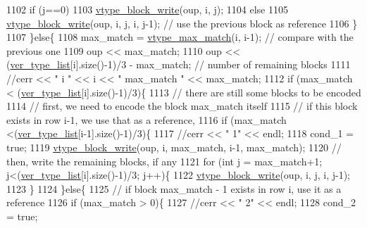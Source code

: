 \begin{DoxyCode}
1102           \textcolor{keywordflow}{if} (j==0)
1103             \hyperlink{classmarked__graph__compressed_a31f9ea72682f9072d0f90faf58a603fe}{vtype\_block\_write}(oup, i, j);
1104           \textcolor{keywordflow}{else}
1105             \hyperlink{classmarked__graph__compressed_a31f9ea72682f9072d0f90faf58a603fe}{vtype\_block\_write}(oup, i, j, i, j-1); \textcolor{comment}{// use the previous block as reference}
1106         \}
1107       \}\textcolor{keywordflow}{else}\{
1108         max\_match = \hyperlink{classmarked__graph__compressed_a5ce51414e335d817f4be781fdcfbe9b1}{vtype\_max\_match}(i, i-1); \textcolor{comment}{// compare with the previous one}
1109         oup << max\_match;
1110         oup << (\hyperlink{classmarked__graph__compressed_af2e3e55223d436628a02758dfae88493}{ver\_type\_list}[i].size()-1)/3 - max\_match; \textcolor{comment}{// number of remaining blocks}
1111         \textcolor{comment}{//cerr << " i " << i << " max\_match " << max\_match;}
1112         \textcolor{keywordflow}{if} (max\_match < (\hyperlink{classmarked__graph__compressed_af2e3e55223d436628a02758dfae88493}{ver\_type\_list}[i].size()-1)/3)\{
1113           \textcolor{comment}{// there are still some blocks to be encoded}
1114           \textcolor{comment}{// first, we need to encode the block max\_match itself}
1115           \textcolor{comment}{// if this block exists in row i-1, we use that as a reference,}
1116           \textcolor{keywordflow}{if} (max\_match <(\hyperlink{classmarked__graph__compressed_af2e3e55223d436628a02758dfae88493}{ver\_type\_list}[i-1].size()-1)/3)\{
1117             \textcolor{comment}{//cerr << " 1" << endl;}
1118             cond\_1 = \textcolor{keyword}{true};
1119             \hyperlink{classmarked__graph__compressed_a31f9ea72682f9072d0f90faf58a603fe}{vtype\_block\_write}(oup, i, max\_match, i-1, max\_match);
1120             \textcolor{comment}{// then, write the remaining blocks, if any}
1121             \textcolor{keywordflow}{for} (\textcolor{keywordtype}{int} j = max\_match+1; j<(\hyperlink{classmarked__graph__compressed_af2e3e55223d436628a02758dfae88493}{ver\_type\_list}[i].size()-1)/3; j++)\{
1122               \hyperlink{classmarked__graph__compressed_a31f9ea72682f9072d0f90faf58a603fe}{vtype\_block\_write}(oup, i, j, i, j-1);
1123             \}
1124           \}\textcolor{keywordflow}{else}\{
1125             \textcolor{comment}{// if block max\_match - 1 exists in row i, use it as a reference}
1126             \textcolor{keywordflow}{if} (max\_match > 0)\{
1127               \textcolor{comment}{//cerr << " 2" << endl;}
1128               cond\_2 = \textcolor{keyword}{true};

\end{DoxyCode}
